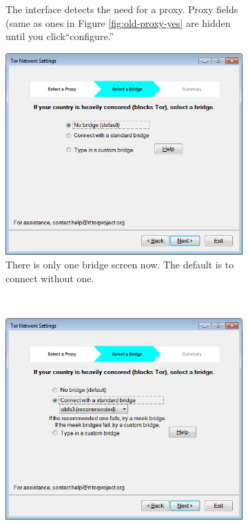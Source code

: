 \documentclass[USenglish,oneside,twocolumn]{article}
\begin{document}
\begin{figure}
\begin{subfigure}[b]{0.35\textwidth}
	\caption{The interface detects the need for a proxy. Proxy fields (same as ones in Figure \ref{fig:old-proxy-yes} are hidden until you click``configure.''}
	\label{fig:new-proxy}
\end{subfigure}
\begin{subfigure}[b]{0.35\textwidth}
	\includegraphics[width=\textwidth]{screenshots/NEW-bridgeSettings.png}
	\caption{There is only one bridge screen now. The default is to connect without one.}
	\label{fig:new-nobridge}
\end{subfigure}
~~~~~~~~~~
\begin{subfigure}[b]{0.35\textwidth}
	\includegraphics[width=\textwidth]{screenshots/NEW-bridgeSettings-default.png}

\end{subfigure}
\end{figure}
\end{document}
